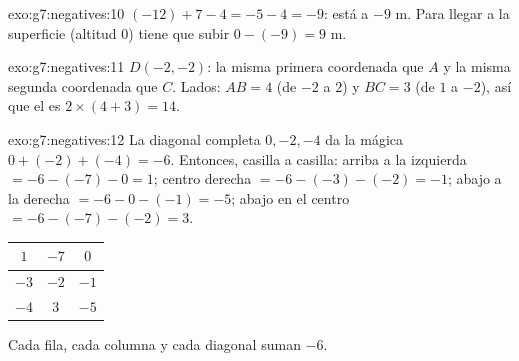 \begin{solution}{exo:g7:negatives:10}
$(-12) + 7 - 4 = -5 - 4 = -9$: está a $-9$ m. Para llegar a la superficie
(altitud $0$) tiene que subir $0 - (-9) = 9$ m.
\end{solution}

\begin{solution}{exo:g7:negatives:11}
$D(-2, -2)$: la misma primera coordenada que $A$ y la misma segunda coordenada que
$C$. Lados: $AB = 4$ (de $-2$ a $2$) y $BC = 3$ (de $1$ a
$-2$), así que el  es $2 \times (4 + 3) = 14$.
\end{solution}

\begin{solution}{exo:g7:negatives:12}
La diagonal completa $0, -2, -4$ da la  mágica
$0 + (-2) + (-4) = -6$. Entonces, casilla a casilla:
arriba a la izquierda $= -6 - (-7) - 0 = 1$; centro derecha $= -6 - (-3) - (-2) =
-1$; abajo a la derecha $= -6 - 0 - (-1) = -5$; abajo en el centro
$= -6 - (-7) - (-2) = 3$.
\begin{center}
\renewcommand{\arraystretch}{1.4}
\begin{tabular}{|c|c|c|}
\hline
$1$ & $-7$ & $0$ \\
\hline
$-3$ & $-2$ & $-1$ \\
\hline
$-4$ & $3$ & $-5$ \\
\hline
\end{tabular}
\end{center}
Cada fila, cada columna y cada diagonal suman $-6$.
\end{solution}

